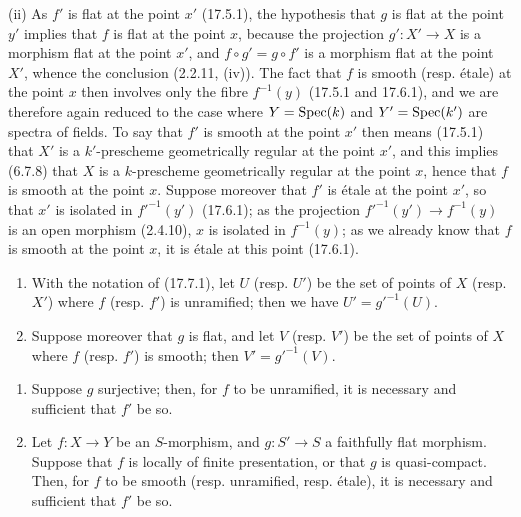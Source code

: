 (ii) As $f'$ is flat at the point $x'$ (17.5.1), the hypothesis that $g$ is flat at the point $y'$ implies that $f$ is flat at the point $x$, because the projection $g':X'\to X$ is a morphism flat at the point $x'$, and $f\circ g'=g\circ f'$ is a morphism flat at the point $X'$, whence the conclusion (2.2.11, (iv)). The fact that $f$ is smooth (resp. étale) at the point $x$ then involves only the fibre $f^{-1}(y)$ (17.5.1 and 17.6.1), and we are therefore again reduced to the case where $Y=\operatorname{Spec}(k)$ and $Y'=\operatorname{Spec}(k')$ are spectra of fields. To say that $f'$ is smooth at the point $x'$ then means (17.5.1) that $X'$ is a $k'$-prescheme geometrically regular at the point $x'$, and this implies (6.7.8) that $X$ is a $k$-prescheme geometrically regular at the point $x$, hence that $f$ is smooth at the point $x$. Suppose moreover that $f'$ is étale at the point $x'$, so that $x'$ is isolated in $f'^{-1}(y')$ (17.6.1); as the projection $f'^{-1}(y')\to f^{-1}(y)$ is an open morphism (2.4.10), $x$ is isolated in $f^{-1}(y)$; as we already know that $f$ is smooth at the point $x$, it is étale at this point (17.6.1).

\begin{corollary}[17.7.2]
\label{IV.17.7.2}
\begin{enumerate}
  \item[(i)] With the notation of (17.7.1), let $U$ (resp. $U'$) be the set of points of $X$ (resp. $X'$) where $f$ (resp. $f'$) is unramified; then we have $U'=g'^{-1}(U)$.
  \item[(ii)] Suppose moreover that $g$ is flat, and let $V$ (resp. $V'$) be the set of points of $X$ where $f$ (resp. $f'$) is smooth; then $V'=g'^{-1}(V)$.
\end{enumerate}
\end{corollary}

\begin{corollary}[17.7.3]
\label{IV.17.7.3}
\begin{enumerate}
  \item[(i)] Suppose $g$ surjective; then, for $f$ to be unramified, it is necessary and sufficient that $f'$ be so.
  \item[(ii)] Let $f:X\to Y$ be an $S$-morphism, and $g:S'\to S$ a faithfully flat morphism. Suppose that $f$ is locally of finite presentation, or that $g$ is quasi-compact. Then, for $f$ to be smooth (resp. unramified, resp. étale), it is necessary and sufficient that $f'$ be so.
\end{enumerate}
\end{corollary}

